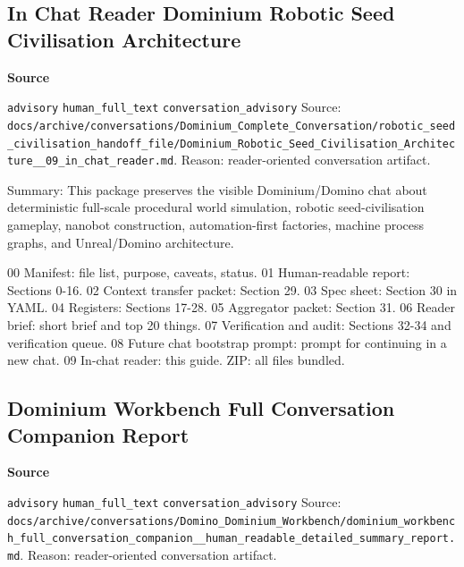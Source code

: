 \documentclass[9pt,a4paper,openany]{book}
\newcommand{\vonecallout}[3]{\par\medskip\noindent\begingroup\setlength{\fboxsep}{7pt}\colorbox{DomCalloutBg}{\parbox{0.94\linewidth}{\textbf{\textcolor{#1}{#2}}\par #3}}\endgroup\par\medskip}
\begin{document}
\subsection{In Chat Reader Dominium Robotic Seed Civilisation Architecture}

\vonecallout{DomSlate}{Source}{\texttt{advisory} \texttt{human\_\allowbreak{}full\_\allowbreak{}text} \texttt{conversation\_\allowbreak{}advisory} Source: \texttt{docs/\allowbreak{}archive/\allowbreak{}conversations/\allowbreak{}Dominium\_\allowbreak{}Complete\_\allowbreak{}Conversation/\allowbreak{}robotic\_\allowbreak{}seed\_\allowbreak{}civilisation\_\allowbreak{}handoff\_\allowbreak{}file/\allowbreak{}Dominium\_\allowbreak{}Robotic\_\allowbreak{}Seed\_\allowbreak{}Civilisation\_\allowbreak{}Architecture\_\allowbreak{}\_\allowbreak{}09\_\allowbreak{}in\_\allowbreak{}chat\_\allowbreak{}reader.\allowbreak{}md}.\allowbreak{} Reason: reader-\allowbreak{}oriented conversation artifact.\allowbreak{}}

Summary: This package preserves the visible Dominium/\allowbreak{}Domino chat about deterministic full-\allowbreak{}scale procedural world simulation, robotic seed-\allowbreak{}civilisation gameplay, nanobot construction, automation-\allowbreak{}first factories, machine process graphs, and Unreal/\allowbreak{}Domino architecture.\allowbreak{}


00 Manifest: file list, purpose, caveats, status.\allowbreak{} 01 Human-\allowbreak{}readable report: Sections 0-\allowbreak{}16.\allowbreak{} 02 Context transfer packet: Section 29.\allowbreak{} 03 Spec sheet: Section 30 in YAML.\allowbreak{} 04 Registers: Sections 17-\allowbreak{}28.\allowbreak{} 05 Aggregator packet: Section 31.\allowbreak{} 06 Reader brief: short brief and top 20 things.\allowbreak{} 07 Verification and audit: Sections 32-\allowbreak{}34 and verification queue.\allowbreak{} 08 Future chat bootstrap prompt: prompt for continuing in a new chat.\allowbreak{} 09 In-\allowbreak{}chat reader: this guide.\allowbreak{} ZIP: all files bundled.\allowbreak{}



\subsection{Dominium Workbench Full Conversation Companion Report}

\vonecallout{DomSlate}{Source}{\texttt{advisory} \texttt{human\_\allowbreak{}full\_\allowbreak{}text} \texttt{conversation\_\allowbreak{}advisory} Source: \texttt{docs/\allowbreak{}archive/\allowbreak{}conversations/\allowbreak{}Domino\_\allowbreak{}Dominium\_\allowbreak{}Workbench/\allowbreak{}dominium\_\allowbreak{}workbench\_\allowbreak{}full\_\allowbreak{}conversation\_\allowbreak{}companion\_\allowbreak{}\_\allowbreak{}human\_\allowbreak{}readable\_\allowbreak{}detailed\_\allowbreak{}summary\_\allowbreak{}report.\allowbreak{}md}.\allowbreak{} Reason: reader-\allowbreak{}oriented conversation artifact.\allowbreak{}}
\end{document}
